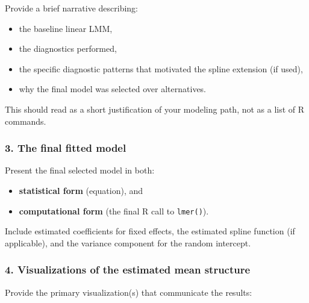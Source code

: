 \documentclass[
  letterpaper,
  DIV=11,
  numbers=noendperiod]{scrreprt}
\providecommand{\tightlist}{%
  \setlength{\itemsep}{0pt}\setlength{\parskip}{0pt}}\usepackage{longtable,booktabs,array}
\begin{document}
Provide a brief narrative describing:

\begin{itemize}
\tightlist
\item
  the baseline linear LMM,\\
\item
  the diagnostics performed,\\
\item
  the specific diagnostic patterns that motivated the spline extension
  (if used),\\
\item
  why the final model was selected over alternatives.
\end{itemize}

This should read as a short justification of your modeling path, not as
a list of R commands.

\hypertarget{the-final-fitted-model}{%
\subsubsection*{\texorpdfstring{\textbf{3. The final fitted
model}}{3. The final fitted model}}\label{the-final-fitted-model}}

Present the final selected model in both:

\begin{itemize}
\tightlist
\item
  \textbf{statistical form} (equation), and\\
\item
  \textbf{computational form} (the final R call to \texttt{lmer()}).
\end{itemize}

Include estimated coefficients for fixed effects, the estimated spline
function (if applicable), and the variance component for the random
intercept.

\hypertarget{visualizations-of-the-estimated-mean-structure}{%
\subsubsection*{\texorpdfstring{\textbf{4. Visualizations of the
estimated mean
structure}}{4. Visualizations of the estimated mean structure}}\label{visualizations-of-the-estimated-mean-structure}}

Provide the primary visualization(s) that communicate the results:
\end{document}
